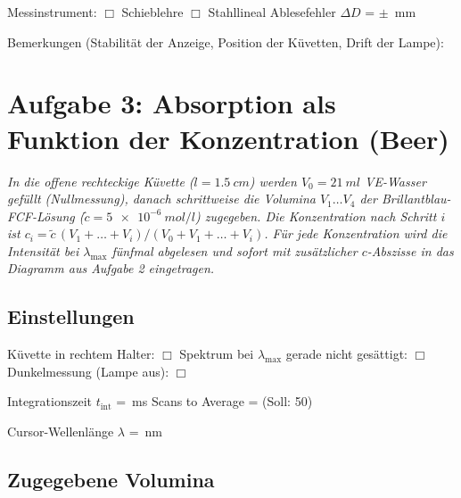 \documentclass{article}
\newcommand{\bl}[1][2cm]{\underline{\hspace{#1}}}
\newcommand{\blu}[2][2cm]{\mbox{\bl[#1]\,\si{#2}}}
\newcommand{\ak}{$\Box$}
\newcommand{\was}[1]{\begingroup\small\itshape #1\par\endgroup\vspace{0.15cm}}
\begin{document}
\noindent Messinstrument: \ak{} Schieblehre \quad \ak{} Stahllineal \qquad
Ablesefehler $\Delta D$ = $\pm$ \blu[1.8cm]{mm}

\vspace{0.4cm}

\noindent Bemerkungen (Stabilit\"at der Anzeige, Position der K\"uvetten, Drift der
Lampe):

\vspace{0.2cm}
\noindent \bl[15cm]

\newpage

\section{Aufgabe 3: Absorption als Funktion der Konzentration (Beer)}

\was{In die offene rechteckige K\"uvette ($l = \SI{1,5}{cm}$) werden
$V_0 = \SI{21}{ml}$ VE-Wasser gef\"ullt (Nullmessung), danach schrittweise die
Volumina $V_1 \dots V_4$ der Brillantblau-FCF-L\"osung ($\tilde{c} = \SI{5e-6}{mol/l}$)
zugegeben. Die Konzentration nach Schritt $i$ ist
$c_i = \tilde{c}\,(V_1 + \dots + V_i)/(V_0 + V_1 + \dots + V_i)$. F\"ur jede
Konzentration wird die Intensit\"at bei $\lambda_\mathrm{max}$ f\"unfmal abgelesen und sofort
mit zus\"atzlicher $c$-Abszisse in das Diagramm aus Aufgabe 2 eingetragen.}

\subsection{Einstellungen}

\begin{center}
  K\"uvette in rechtem Halter: \ak{} \qquad
  Spektrum bei $\lambda_\mathrm{max}$ gerade nicht ges\"attigt: \ak{} \\[4pt]
  Dunkelmessung (Lampe aus): \ak{}
\end{center}

\noindent Integrationszeit $t_\mathrm{int}$ = \blu[2.2cm]{ms} \qquad
Scans to Average = \bl[1.8cm] (Soll: 50)

\vspace{0.25cm}
\noindent Cursor-Wellenl\"ange $\lambda$ = \blu[1.8cm]{nm}

\subsection{Zugegebene Volumina}
\end{document}
